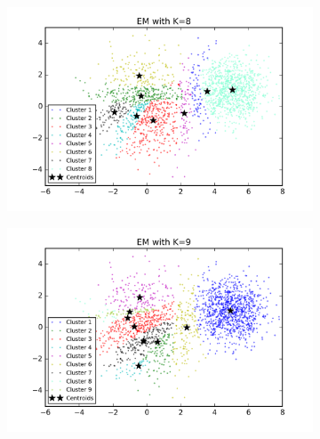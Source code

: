 \begin{figure}[htb]
\begin{subfigure}[b]{0.475\textwidth}
        \end{subfigure}
        \hfill
        \begin{subfigure}[b]{0.475\textwidth}  
            \centering 
            \includegraphics[width=\textwidth]{./figures/clustering_EM_8.png}
        \end{subfigure}
        \begin{subfigure}[b]{0.475\textwidth}   
            \centering 
            \includegraphics[width=\textwidth]{./figures/clustering_EM_9.png}
        \end{subfigure}
        \hfill
        \begin{subfigure}[b]{0.475\textwidth}   
            \centering 

\end{subfigure}
\end{figure}
